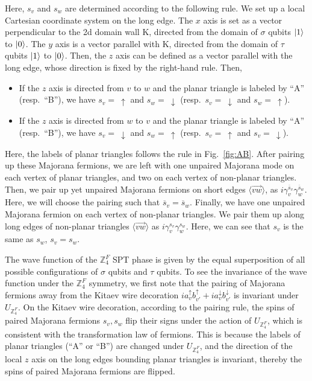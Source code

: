 \documentclass[12pt]{article}
\numberwithin{equation}{section}
\begin{document}
Here, $s_v$ and $s_w$ are determined according to the following rule. We set up a local Cartesian coordinate system on the long edge.
The $x$ axis is set as a vector perpendicular to the 2d domain wall $\mathrm{K}$, directed from the domain of $\sigma$ qubits $\ket{1}$ to $\ket{0}$.
The $y$ axis is a vector parallel with $\mathrm{K}$, directed from the domain of $\tau$ qubits $\ket{1}$ to $\ket{0}$. Then, the $z$ axis can be defined as a vector parallel with the long edge, whose direction is fixed by the right-hand rule. Then,
\begin{itemize}
    \item If the $z$ axis is directed from $v$ to $w$ and the planar triangle is labeled by ``A'' (resp.~``B''), we have $s_v=\ \uparrow$ and $s_w=\ \downarrow$ (resp.~$s_v=\ \downarrow$ and $s_w=\ \uparrow$).
    \item If the $z$ axis is directed from $w$ to $v$ and the planar triangle is labeled by ``A'' (resp.~``B''), we have $s_v=\ \downarrow$ and $s_w=\ \uparrow$ (resp.~$s_v=\ \uparrow$ and $s_v=\ \downarrow$).
\end{itemize}
Here, the labels of planar triangles follows the rule in Fig.~\ref{fig:AB}.
After pairing up these Majorana fermions, we are left with one unpaired Majorana mode on each vertex of planar triangles, and two on each vertex of non-planar triangles. 
Then, we pair up yet unpaired Majorana fermions on short edges $\langle \overrightarrow{vw}\rangle$, as $i\gamma_v^{\overline{s}_v}\gamma_{w}^{\overline{s}_w}$. 
Here, we will choose the pairing such that $\overline{s}_v=\overline{s}_w$.
Finally, we have one unpaired Majorana fermion on each vertex of non-planar triangles. We pair them up along long edges of non-planar triangles $\langle \overrightarrow{vw}\rangle$ as $i\gamma_v^{s_v}\gamma_{w}^{s_w}$. Here, we can see that $s_v$ is the same as $s_w$, $s_v=s_w$.

The wave function of the $\mathbb{Z}_4^F$ SPT phase is given by the equal superposition of all possible configurations of $\sigma$ qubits and $\tau$ qubits. To see the invariance of the wave function under the $\mathbb{Z}_4^F$ symmetry, we first note that the pairing of Majorana fermions away from the Kitaev wire decoration $ia_v^{\uparrow}b_{v'}^{\uparrow}+ia_v^{\downarrow}b_{v'}^{\downarrow}$ is invariant under $U_{\mathbb{Z}_4^F}$. 
On the Kitaev wire decoration, according to the pairing rule, the spins of paired Majorana fermions $s_v, s_w$ flip their signs under the action of $U_{\mathbb{Z}_4^F}$, which is consistent with the transformation law of fermions. This is because the labels of planar triangles (``A'' or ``B'') are changed under $U_{\mathbb{Z}_4^F}$, and the direction of the local $z$ axis on the long edges bounding planar triangles is invariant, thereby the spins of paired Majorana fermions are flipped. 
\end{document}
